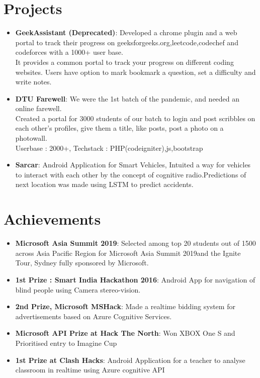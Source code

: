 \documentclass[letterpaper,11pt]{article}
\newcommand{\resumeItem}[2]{
  \item\small{
    \textbf{#1}{: #2 \vspace{-2pt}}
  }
}
\newcommand{\resumeSubItem}[2]{\resumeItem{#1}{#2}\vspace{-6pt}}
\newcommand{\resumeSubHeadingListStart}{\begin{itemize}[leftmargin=*]}
\newcommand{\resumeSubHeadingListEnd}{\end{itemize}}
\begin{document}
\section{Projects}
  \resumeSubHeadingListStart
    \resumeSubItem{GeekAssistant (Deprecated)}
      {Developed a chrome plugin and a web portal to track their progress on geeksforgeeks.org,leetcode,codechef and codeforces with a 1000+ user base.}
      \\[0.8em]\textbullet
      {It provides a common portal to track your progress on different coding websites. Users have option to mark bookmark a question, set a difficulty and write notes.}
    \resumeSubItem{DTU Farewell}
      {We were the 1st batch of the pandemic, and needed an online farewell.}
      \\[0.8em]\textbullet
      { Created a portal for 3000 students of our batch to login and post scribbles on each other's profiles, give them a title, like posts, post a photo on a photowall.}
      \\[0em]\textbullet
      { Userbase : 2000+, Techstack : PHP(codeigniter),js,bootstrap}
    \resumeSubItem{Sarcar}
      {Android Application for Smart Vehicles, Intuited a way for vehicles to interact with each other by the concept of cognitive radio.Predictions of next location was made using LSTM to predict accidents.}
      \\[0.8em]
  \resumeSubHeadingListEnd

\section{Achievements}
    \resumeSubHeadingListStart
    \resumeSubItem
    {Microsoft Asia Summit 2019}
    {Selected among top 20 students out of 1500 across Asia Pacific Region for Microsoft Asia Summit 2019and the Ignite Tour, Sydney fully sponsored by Microsoft.}
    \resumeSubItem
    {1st Prize : Smart India Hackathon 2016}
    {Android App for navigation of blind people using Camera stereo-vision.}
    \resumeSubItem
    {2nd Prize, Microsoft MSHack}
    { Made a realtime bidding system for advertisements based on Azure Cognitive Services.}
    \resumeSubItem
    {Microsoft API Prize at Hack The North}
    {Won XBOX One S and Prioritised entry to Imagine Cup}
    \resumeSubItem
    {1st Prize at Clash Hacks}
    {Android Application for a teacher to analyse classroom in realtime using Azure cognitive API}
    \resumeSubHeadingListEnd
\end{document}
